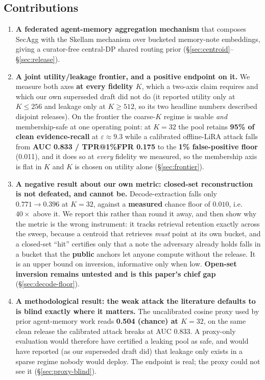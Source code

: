 \documentclass[pdflatex,sn-mathphys-num,iicol]{sn-jnl}
\theoremstyle{thmstyleone}%
\theoremstyle{thmstyletwo}%
\theoremstyle{thmstylethree}%
\newcommand{\eps}{\varepsilon}
\newcommand{\secref}[1]{\S\ref{#1}}
\begin{document}
\subsection*{Contributions}

\begin{enumerate}
  \item \textbf{A federated agent-memory aggregation mechanism} that composes
    SecAgg with the Skellam mechanism over bucketed memory-note embeddings,
    giving a curator-free central-DP shared routing prior
    (\secref{sec:centroid}--\secref{sec:release}).

  \item \textbf{A joint utility/leakage frontier, and a positive endpoint on it.}
    We measure both axes \textbf{at every fidelity $K$}, which a two-axis claim
    requires and which our own superseded draft did not do (it reported utility
    only at $K \leq 256$ and leakage only at $K \geq 512$, so its two headline
    numbers described disjoint releases). On the frontier the coarse-$K$ regime is
    usable \emph{and} membership-safe at one operating point: at $K = 32$ the pool
    retains \textbf{95\% of clean evidence-recall} at $\eps \approx 9.3$ while a
    calibrated offline-LiRA attack falls from \textbf{AUC 0.833 / TPR@1\%FPR 0.175}
    to the \textbf{1\% false-positive floor} (0.011), and it does so at
    \emph{every} fidelity we measured, so the membership axis is flat in $K$ and
    $K$ is chosen on utility alone (\secref{sec:frontier}).

  \item \textbf{A negative result about our own metric: closed-set reconstruction is
    not defeated, and cannot be.} Decode-extraction falls only $0.771 \to 0.396$ at
    $K = 32$, against a \textbf{measured} chance floor of $0.010$, i.e.\ $40\times$ above
    it. We report this rather than round it away, and then show why the metric is the
    wrong instrument: it tracks retrieval retention exactly across the sweep, because
    a centroid that retrieves \emph{must} point at its own bucket, and a closed-set
    ``hit'' certifies only that a note the adversary already holds falls in a bucket
    that the \textbf{public} anchors let anyone compute without the release. It is an
    upper bound on inversion, informative only when low. \textbf{Open-set inversion
    remains untested and is this paper's chief gap} (\secref{sec:decode-floor}).

  \item \textbf{A methodological result: the weak attack the literature defaults
    to is blind exactly where it matters.} The uncalibrated cosine proxy used by
    prior agent-memory work reads \textbf{0.504 (chance) at $K = 32$}, on the
    same clean release the calibrated attack breaks at AUC 0.833. A proxy-only
    evaluation would therefore have certified a leaking pool as safe, and would
    have reported (as our superseded draft did) that leakage only exists in a
    sparse regime nobody would deploy. The endpoint is real; the proxy could not
    see it (\secref{sec:proxy-blind}).


\end{enumerate}
\end{document}
